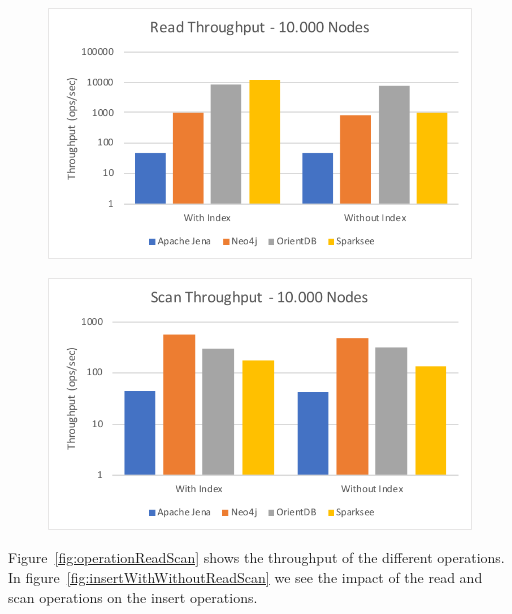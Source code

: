 \begin{figure}[h!]
  \begin{minipage}{.5\textwidth}
    \centering
    \includegraphics[width=\textwidth]{images/responsiveness/readThroughput10000Nodes}
    \label{fig:readThroughput10000Nodes}
  \end{minipage}
  \begin{minipage}{.5\textwidth}
    \centering
    \includegraphics[width=\textwidth]{images/responsiveness/scanThroughput10000Nodes}
    \label{fig:scanThroughput10000Nodes}
  \end{minipage}
\end{figure}

Figure~\ref{fig:operationReadScan} shows the throughput of the different operations.
In figure~\ref{fig:insertWithWithoutReadScan} we see the impact of the read and scan operations on the insert operations.

